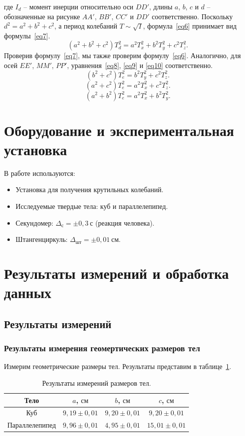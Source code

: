 \documentclass[a4paper,11pt]{article}
\begin{document}
где $I_{d}$ -- момент инерции относительно оси $DD'$, длины $a$, $b$, $c$ и $d$ -- обозначенные на рисунке $AA'$, $BB'$, $CC'$ и $DD'$ соответственно. Поскольку $d^{2} = a^{2} + b^{2} + c^{2}$, а период колебаний $T \sim \sqrt{I}$, формула~\ref{eq6} принимает вид формулы~\ref{eq7}.
\begin{equation}    \label{eq7}
  (a^{2} + b^{2} + c^{2})T_{d}^{2} = a^{2}T_{x}^{2} + b^{2}T_{y}^{2} + c^{2}T_{z}^{2}.
\end{equation}
Проверив формулу~\ref{eq7}, мы также проверим формулу~\ref{eq6}.
Аналогично, для осей $EE'$, $MM'$, $PP'$, уравнения~\ref{eq8}, \ref{eq9} и \ref{eq10} соответственно.
\begin{equation}    \label{eq8}
  (b^{2} + c^{2})T_{e}^{2} = b^{2}T_{y}^{2} + c^{2}T_{z}^{2}.
\end{equation}
\begin{equation}    \label{eq9}
  (a^{2} + c^{2})T_{e}^{2} = a^{2}T_{x}^{2} + c^{2}T_{z}^{2}.
\end{equation}
\begin{equation}    \label{eq10}
  (a^{2} + b^{2})T_{e}^{2} = a^{2}T_{x}^{2} + b^{2}T_{y}^{2}.
\end{equation}
\section{Оборудование и экспериментальная установка}
В работе используются:
\begin{itemize}
        \item Установка для получения крутильных колебаний.
        \item Исследуемые твердые тела: куб и параллелепипед.
        \item Секундомер: $\Delta_{с} = \pm 0,3\ с$ (реакция человека).
        \item Штангенциркуль: $\Delta_{шт} = \pm 0,01\ см$.
\end{itemize}
\section{Результаты измерений и обработка данных}
\subsection{Результаты измерений}
\subsubsection{Результаты измерения геомертических размеров тел} %
Измерим геометрические размеры тел. Результаты представим в таблице~\ref{table:tab1}.
\begin{table}[h!]
\centering
\begin{tabular}{ ||c|c|c|c|| }
  \hline
  Тело & $a$, $см$ & $b$, $см$ & $c$, $см$ \\
  \hline
  Куб & $9,19 \pm 0,01$ & $9,20 \pm 0,01$ & $9,20 \pm 0,01$ \\
  Параллелепипед & $9,96 \pm 0,01$ & $4,95 \pm 0,01$ & $15,01 \pm 0,01$ \\
  \hline
\end{tabular}
\caption{Результаты измерений размеров тел.}
\label{table:tab1}
\end{table}
\end{document}

